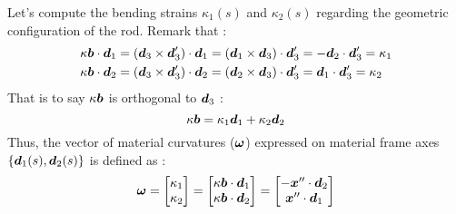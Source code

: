 Let’s compute the bending strains $\kappa_1(s)$ and $\kappa_2(s)$ regarding the geometric configuration of the rod. Remark that :
\begin{equation}
	\begin{aligned}
	&\kappa\boldsymbol{b}\cdot\boldsymbol{d}_1 = (\boldsymbol{d}_3\times\boldsymbol{d}'_3)\cdot\boldsymbol{d}_1 = (\boldsymbol{d}_1\times\boldsymbol{d}_3)\cdot\boldsymbol{d}'_3 = -\boldsymbol{d}_2\cdot\boldsymbol{d}'_3 = \kappa_1 \\
	&\kappa\boldsymbol{b}\cdot\boldsymbol{d}_2 = (\boldsymbol{d}_3\times\boldsymbol{d}'_3)\cdot\boldsymbol{d}_2 = (\boldsymbol{d}_2\times\boldsymbol{d}_3)\cdot\boldsymbol{d}'_3 = \boldsymbol{d}_1\cdot\boldsymbol{d}'_3 = \kappa_2	
	\end{aligned}
\end{equation}
That is to say $\kappa\boldsymbol{b}$ is orthogonal to $\boldsymbol{d}_3$ :
\begin{equation}
	\kappa\boldsymbol{b} = \kappa_1\boldsymbol{d}_1 +   \kappa_2\boldsymbol{d}_2
\end{equation}
Thus, the vector of material curvatures ($\boldsymbol{\omega}$) expressed on material frame axes $\{\boldsymbol{d}_1(s),\boldsymbol{d}_2(s)\}$ is defined as :
\begin{equation}
	\boldsymbol{\omega} =
	\begin{bmatrix}
		\kappa_1\\
		\kappa_2\\
	\end{bmatrix} =
	\begin{bmatrix}
		\kappa\boldsymbol{b}\cdot\boldsymbol{d}_1\\
		\kappa\boldsymbol{b}\cdot\boldsymbol{d}_2\\
	\end{bmatrix} =
		\begin{bmatrix}
		-\boldsymbol{x}''\cdot\boldsymbol{d}_2\\
		\boldsymbol{x}''\cdot\boldsymbol{d}_1\\
	\end{bmatrix}
\end{equation}

